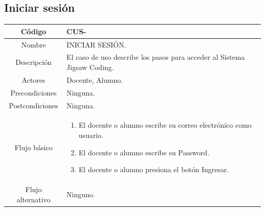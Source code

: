 \subsection{Iniciar sesión}
\begin{longtable}{|c|L{10cm}|}
	\toprule[0.8mm]
	Código &  CUS-\casodeuso\\  \midrule
	Nombre &  INICIAR SESIÓN.\\  \midrule
	Descripción & El caso de uso describe los pasos para acceder al Sistema Jigsaw Coding.\\  \midrule
	Actores & Docente, Alumno. \\  \midrule
	Precondiciones &  Ninguna.\\  \midrule
	Postcondiciones &  Ninguna.\\  \midrule
	Flujo básico &  \begin{enumerate}
		\item El docente o alumno escribe su correo electrónico como usuario.
		\item El docente o alumno escribe su Password.
		\item El docente o alumno presiona el botón Ingresar.
	\end{enumerate}
	\\  \midrule
	Flujo alternativo &  Ninguno.\\  \bottomrule[0.8mm]
\end{longtable}
\clearpage
